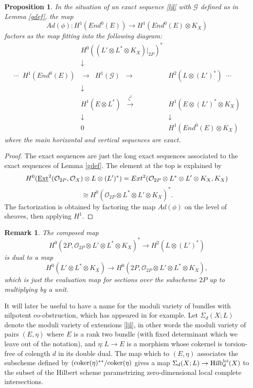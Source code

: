 \documentclass{amsart}
\theoremstyle{plain}
\newtheorem{remark}[theorem]{Remark}
\newtheorem{proposition}[theorem]{Proposition}
\numberwithin{equation}{section}
\begin{document}
\begin{proposition}
\label{bigdiag}
In the situation of an exact sequence \eqref{ljl} with ${{\mathcal G}}$ defined as in 
Lemma \ref{gdef}, the map 
$$
Ad(\phi ): H^1(End ^0(E))\rightarrow H^1(End ^0(E)\otimes K_X)
$$
factors as the map fitting into the following diagram:
$$
\begin{array}{ccc}
& {\scriptstyle H^0((L'\otimes L^{\ast}\otimes K_X)|_{2P})^{\ast}} & \\
& \downarrow & \\
\cdots \;\; 
H^1(End ^0(E)) & \longrightarrow \;\; H^1({{\mathcal G}} )\;\;  \longrightarrow & H^2(L\otimes (L')^{\ast})   \;\; \cdots \\
& \downarrow & \\
& H^1(E\otimes L^{\ast}) \;\; \stackrel{\zeta ^t}{\longrightarrow}  &H^1(E\otimes (L')^{\ast}\otimes K_X) \\
& \downarrow &\downarrow \\
& 0 &H^1(End ^0(E)\otimes K_X) 
\end{array}
$$
where the main horizontal and vertical sequences are exact. 
\end{proposition}
\begin{proof}
The exact sequences are just the long exact sequences associated to the
exact sequences of Lemma \ref{gdef}. 
The element at the top is explained by
$$
H^0({\underline{{\rm Ext}}} ^2({{\mathcal O}} _{2P},{{\mathcal O}} _X)\otimes
L\otimes (L')^{\ast}) = Ext ^2({{\mathcal O}} _{2P}\otimes L^{\ast} \otimes L'\otimes K_X, K_X)
$$
$$
\cong H^0({{\mathcal O}} _{2P}\otimes L^{\ast} \otimes L'\otimes K_X)^{\ast}.
$$
The factorization is obtained by factoring the map $Ad(\phi )$ on the level of
sheaves, then applying $H^1$. 
\end{proof}

\begin{remark}
\label{whatmap}
The composed map
$$
H^0(2P, {{\mathcal O}} _{2P}\otimes L'\otimes L^{\ast}\otimes K_X)^{\ast}
\rightarrow 
H^2(L\otimes (L')^{\ast})
$$
is dual to a map
$$
H^0(L'\otimes L^{\ast}\otimes K_X)\rightarrow 
H^0(2P, {{\mathcal O}} _{2P}\otimes L'\otimes L^{\ast}\otimes K_X),
$$
which is just the evaluation map for sections over the subscheme $2P$ up to multiplying
by a unit. 
\end{remark}

It will later be useful to have a name for the moduli variety of bundles with
nilpotent co-obstruction,
which has appeared in \cite{OGradyBasic} \cite{Nijsse} \cite{Zuo} \cite{Langer} 
for example.
Let $\Sigma _d(X; L)$ denote the moduli variety of extensions  \eqref{ljl},
in other words the moduli variety of pairs $(E,\eta )$ where $E$ is a rank two bundle
(with fixed determinant which we leave out of the notation),
and $\eta : L\rightarrow E$ is a morphism whose cokernel is torsion-free of colength $d$ in
its double dual. The map which to $(E,\eta )$ associates the subscheme defined by 
$({\rm coker}(\eta )^{\ast \ast}/{\rm coker}(\eta )$ gives a map $\Sigma _d(X; L)\rightarrow
{{\rm Hilb}} ^{\rm lci}_d(X)$ to the subset of the Hilbert scheme parametrizing zero-dimensional
local complete intersections. 
\end{document}
